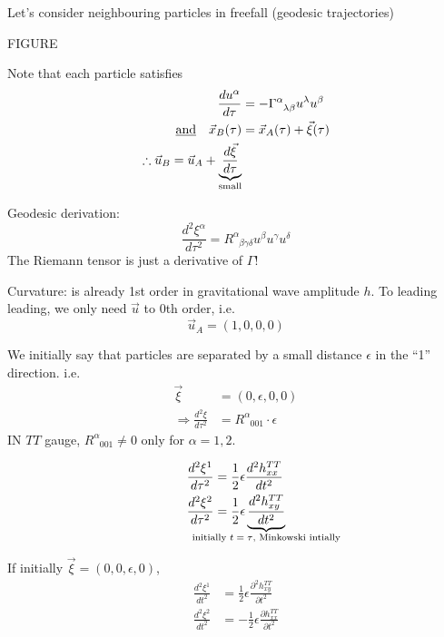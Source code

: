 \documentclass[a4paper]{article} %
\newcommand{\ph}[1]{\phantom{#1}}
\begin{document}
Let's consider neighbouring particles in freefall (geodesic trajectories)

FIGURE

Note that each particle satisfies
\begin{align}
\frac{du^{\alpha}}{d\tau}&=-\Gamma^{\alpha}_{\ph{\alpha}\lambda\beta}u^{\lambda}u^{\beta}\\
\text{\underline{and}}\quad \vec{x}_{B}(\tau	)&=\vec{x}_{A}(\tau)+\vec{\xi}(\tau)\\
\therefore \vec{u}_B=\vec{u}_A+\underbrace{\frac{d\vec{\xi}}{d\tau}}_{\text{small}}
\end{align}

Geodesic derivation:
\begin{equation}
\frac{d^2\xi^{\alpha}}{d\tau^2}=R^{\alpha}_{\ph{\alpha}\beta\gamma\delta}u^{\beta}u^{\gamma}u^{\delta}
\end{equation}
The Riemann tensor is just a derivative of $\Gamma$!

Curvature: is already 1st order in gravitational wave amplitude $h$. To leading leading, we only need $\vec{u}$ to 0th order, i.e.
\begin{equation}
\vec{u}_A=(1,0,0,0)
\end{equation}

We initially say that particles are separated by a small distance $\epsilon$ in the ``1'' direction. i.e.
\begin{align}
\vec{\xi}&=(0,\epsilon, 0,0)\\
\Rightarrow \frac{d^2\xi}{d\tau^2}&=R^{\alpha}_{\ph{\alpha}001}\cdot \epsilon
\end{align}
IN $TT$ gauge, $R^{\alpha}_{\ph{\alpha}001}\neq 0$ only for $\alpha = 1,2$.

\begin{align}
\frac{d^2\xi^1}{d\tau^2}&=\frac{1}{2}\epsilon \frac{d^2h^{TT}_{xx}}{dt^2}\\
\frac{d^2\xi^2}{d\tau^2}&=\frac{1}{2}\epsilon \underbrace{\frac{d^2 h^{TT}_{xy}}{dt^2}}_
{\mathclap{\text{initially $t=\tau$, Minkowski intially}}}
\end{align}

If initially $\vec{\xi}=(0,0,\epsilon,0)$,
\begin{align}
\frac{d^2\xi^{1}}{dt^2}&=\frac{1}{2}\epsilon\frac{\partial^2 h^{TT}_{xy}}{\partial t^2}\\
\frac{d^2\xi^{2}}{dt^2}&=-\frac{1}{2}\epsilon \frac{\partial h^{TT}_{xx}}{\partial t^2}
\end{align}
\end{document}

